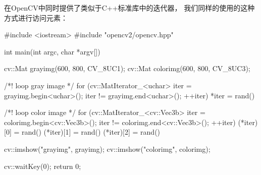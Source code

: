 在OpenCV中同时提供了类似于C++标准库中的迭代器，%
我们同样的使用的这种方式进行访问元素：
\begin{cppcode}
  #include <iostream>
  #include "opencv2/opencv.hpp"

  int main(int argc, char *argv[]){
    cv::Mat grayimg(600, 800, CV_8UC1);
    cv::Mat colorimg(600, 800, CV_8UC3);

    /*! loop gray image */
    for (cv::MatIterator_<uchar> iter = grayimg.begin<uchar>();
    iter != grayimg.end<uchar>();
    ++iter){
      *iter = rand() %
    }

    /*! loop color image */
    for (cv::MatIterator_<cv::Vec3b> iter = colorimg.begin<cv::Vec3b>();
    iter != colorimg.end<cv::Vec3b>();
    ++iter){
      (*iter)[0] = rand() %
      (*iter)[1] = rand() %
      (*iter)[2] = rand() %
    }

    cv::imshow("grayimg", grayimg);
    cv::imshow("colorimg", colorimg);

    cv::waitKey(0);
    return 0;
  }
\end{cppcode}

